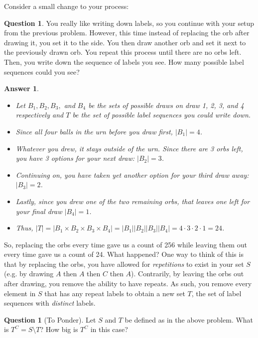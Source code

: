 \documentclass[openany]{book}
\newtheorem{answer}[thm]{Answer}
\theoremstyle{definition}
\newtheorem{question}[thm]{Question}
\begin{document}
    Consider a small change to your process:
\begin{question}\hfill

        You really like writing down labels, so you continue with your setup from the previous problem. However, this time instead of replacing the orb after drawing it, you set it to the side. You then draw another orb and set it next to the previously drawn orb. You repeat this process until there are no orbs left. Then, you write down the sequence of labels you see. How many possible label sequences could you see?
    \end{question}

\begin{answer}\hfill

    \begin{itemize}
        \item Let $B_1, B_2, B_3,$ and $B_4$ be the sets of possible draws on draw 1, 2, 3, and 4 respectively and $T$ be the set of possible label sequences you could write down. 
        \item Since all four balls in the urn before you draw first, $|B_1|=4$.
        \item Whatever you drew, it stays outside of the urn. Since there are 3 orbs left, you have 3 options for your next draw: $|B_2|=3$.
        \item Continuing on, you have taken yet another option for your third draw away: $|B_3|=2$.
        \item Lastly, since you drew one of the two remaining orbs, that leaves one left for your final draw $|B_4|=1$.
        \item Thus, $|T|=|B_1\times B_2\times B_3\times B_4|=|B_1||B_2||B_3||B_4|=4\cdot 3\cdot 2\cdot 1=24$.
    \end{itemize}
\end{answer}
    So, replacing the orbs every time gave us a count of 256 while leaving them out every time gave us a count of 24. What happened? One way to think of this is that by replacing the orbs, you have allowed for \emph{repetitions} to exist in your set $S$ (e.g. by drawing $A$ then $A$ then $C$ then $A$). Contrarily, by leaving the orbs out after drawing, you remove the ability to have repeats. As such, you remove every element in $S$ that has any repeat labels to obtain a new set $T$, the set of label sequences with \emph{distinct} labels.
\begin{question}[To Ponder]\hfill

        Let $S$ and $T$ be defined as in the above problem. What is $T^C=S\setminus T$? How big is $T^C$ in this case?
    \end{question}
\end{document}

